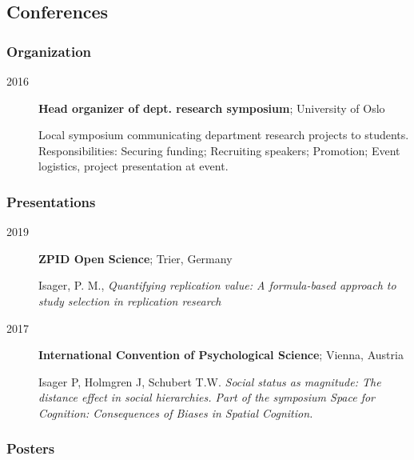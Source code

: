 \documentclass[]{article}
\begin{document}
\subsection{Conferences}\label{conferences}

\subsubsection{Organization}\label{organization}

\begin{description}
\item[2016]
\textbf{Head organizer of dept. research symposium}; University of Oslo

Local symposium communicating department research projects to students.
Responsibilities: Securing funding; Recruiting speakers; Promotion;
Event logistics, project presentation at event.
\end{description}

\subsubsection{Presentations}\label{presentations}

\begin{description}
\item[2019]
\textbf{ZPID Open Science}; Trier, Germany

Isager, P. M., \emph{Quantifying replication value: A formula-based
approach to study selection in replication research}
\item[2017]
\textbf{International Convention of Psychological Science}; Vienna,
Austria

Isager P, Holmgren J, Schubert T.W. \emph{Social status as magnitude:
The distance effect in social hierarchies. Part of the symposium Space
for Cognition: Consequences of Biases in Spatial Cognition.}
\end{description}

\subsubsection{Posters}\label{posters}
\end{document}
